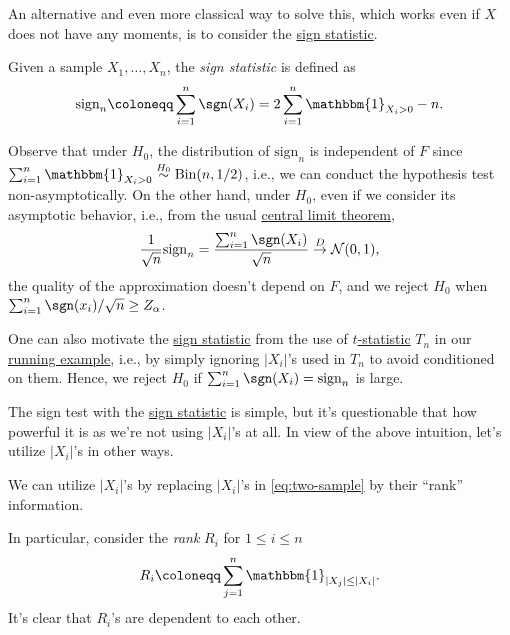 An alternative and even more classical way to solve this, which works even if \(X\) does not have any moments, is to consider the \hyperref[def:sign-statistic]{sign statistic}.

\begin{definition}\label{def:sign-statistic}
	Given a sample \(X_1, \dots , X_n\), the \emph{sign statistic} is defined as
	\[
		\mathrm{sign} _n
		\coloneqq \sum_{i=1}^{n} \sgn (X_i)
		= 2 \sum_{i=1}^{n} \mathbbm{1}_{X_i > 0} - n .
	\]
\end{definition}

Observe that under \(H_0\), the distribution of \(\mathrm{sign} _n\) is independent of \(F\) since \(\sum_{i=1}^{n} \mathbbm{1}_{X_i > 0} \overset{H_0}{\sim} \operatorname{Bin}(n, 1 / 2)\), i.e., we can conduct the hypothesis test non-asymptotically. On the other hand, under \(H_0\), even if we consider its asymptotic behavior, i.e., from the usual \hyperref[thm:CLT]{central limit theorem},
\[
	\frac{1}{\sqrt{n} } \mathrm{sign} _n
	= \frac{\sum_{i=1}^{n} \sgn (X_i)}{\sqrt{n} }
	\overset{D}{\to} \mathcal{N} (0, 1),
\]
the quality of the approximation doesn't depend on \(F\), and we reject \(H_0\) when \(\sum_{i=1}^{n} \sgn (x_i) / \sqrt{n} \geq Z_\alpha \).

\begin{eg}
	One can also motivate the \hyperref[def:sign-statistic]{sign statistic} from the use of \hyperref[def:t-statistic]{\(t\)-statistic} \(T_n\) in our \hyperref[eg:two-sample-t-statistic]{running example}, i.e., by simply ignoring \(\lvert X_i \rvert \)'s used in \(T_n\) to avoid conditioned on them. Hence, we reject \(H_0\) if \(\sum_{i=1}^{n} \sgn (X_i) = \mathrm{sign} _n\) is large.
\end{eg}

The sign test with the \hyperref[def:sign-statistic]{sign statistic} is simple, but it's questionable that how powerful it is as we're not using \(\vert X_i \vert \)'s at all. In view of the above intuition, let's utilize \(\lvert X_i \rvert \)'s in other ways.

\begin{intuition}
	We can utilize \(\vert X_i \vert \)'s by replacing \(\lvert X_i \rvert \)'s in \autoref{eq:two-sample} by their ``rank'' information.
\end{intuition}

In particular, consider the \emph{rank} \(R_i\) for \(1 \leq i \leq n\)
\[
	R_i
	\coloneqq \sum_{j=1}^{n} \mathbbm{1}_{\vert X_j \vert \leq \vert X_i \vert }.
\]
It's clear that \(R_i\)'s are dependent to each other.

